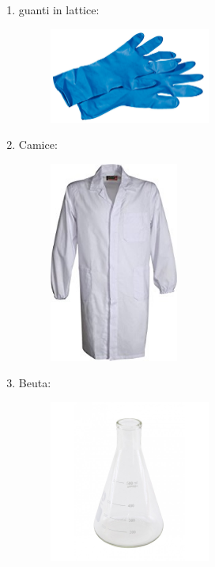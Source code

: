 \documentclass{article}
\begin{document}
\begin{enumerate}
		\item guanti in lattice:

		\begin{figure}[H]

			\includegraphics[width=0.5\textwidth]{./immagini/guanti.jpg}
			\label{guanti}

		\end{figure}

		\vspace{0.5cm}


		\item Camice:

		\begin{figure}[H]

			\includegraphics[width=0.4\textwidth]{./immagini/camice.jpg}
			\label{camice}

		\end{figure}

		\vspace{0.5cm}


		\item Beuta:

		\begin{figure}[H]

			\includegraphics[width=0.5\textwidth]{./immagini/beuta.jpg}
			\label{camice}


\end{figure}
\end{enumerate}
\end{document}
